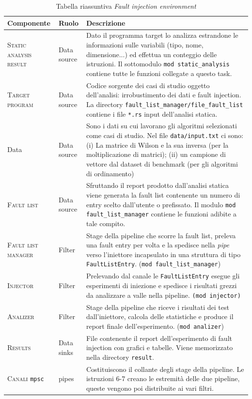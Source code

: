 \begin{table}[h] 
    \centering
    \small
    \begin{tabular}{p{4cm} p{2.5cm} p{8.5cm}}
        \toprule[1.5px]
        \textbf{\large Componente}&\textbf{\large Ruolo}&\textbf{\large Descrizione}\\
        \midrule[1.5px]
        \textsc{Static analysis result}&Data source&Dato il programma target lo analizza estrandone le informazioni sulle variabili (tipo, nome, dimensione...) ed  effettua un conteggio delle istruzioni. Il sottomodulo \texttt{mod static\_analysis} contiene tutte le funzioni collegate a questo task.\\
        \hline
        \textsc{Target program}&Data source&
            Codice sorgente dei casi di studio oggetto dell'analisi: irrobustimento dei dati e fault injection. La directory \texttt{fault\_list\_manager/file\_fault\_list} contiene i file \texttt{*.rs} input dell'analisi statica.\\
            \hline
            Data&Data source&Sono i dati su cui lavorano gli algoritmi selezionati come casi di studio. Nel file \texttt{data/input.txt} ci sono: (i) La matrice di Wilson e la sua inversa (per la moltiplicazione di matrici); (ii) un campione di vettore dal dataset di benchmark \cite{benchmark} (per gli algoritmi di ordinamento)\\
            \hline
        \textsc{Fault list}&Data source& Sfruttando il report prodotto dall'analisi statica viene generata la fault list contenente un numero di entry scelto dall'utente o prefissato. Il modulo \texttt{mod fault\_list\_manager} contiene le funzioni adibite a tale compito.\\
        \midrule
        \textsc{Fault list manager}&Filter&Stage della pipeline che scorre la fault list, preleva una fault entry per volta e la spedisce nella \textit{pipe} verso l'iniettore incapsulato in una struttura di tipo \texttt{FaultListEntry}. (\texttt{mod fault\_list\_manager})\\\hline
        \textsc{Injector}&Filter&Prelevando dal canale le \texttt{FaultListEntry} esegue gli esperimenti di iniezione e spedisce i risultati grezzi da analizzare a valle nella pipeline. \texttt{(mod injector)}\\\hline
        \textsc{Analizer}&Filter&Stage della pipeline che riceve i risultati dei test dall'iniettore, calcola delle statistiche e produce il report finale dell'esperimento. (\texttt{mod analizer})\\\hline
        \textsc{Results}&Data sinks&File contenente il report dell'esperimento di fault injection con grafici e tabelle. Viene memorizzato nella directory \texttt{result}.\\
        \midrule
        \textsc{Canali} \texttt{mpsc}&pipes&Costituiscono il collante degli stage della pipeline. Le istruzioni 6-7 creano le estremità delle due pipeline, queste vengono poi distribuite ai vari filtri.\\
        \bottomrule[1.5px]
   \end{tabular}
    \caption{Tabella riassuntiva \textit{Fault injection environment}}
    \label{setup}
\end{table}